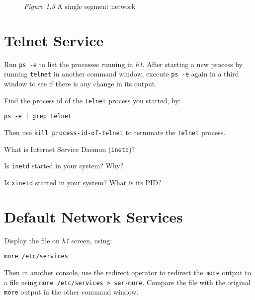 \documentclass{../UTNetLab}
\begin{document}
\begin{center}
\begin{minipage}{0.48\textwidth}
\begin{flushright}
\begin{figure}[H]
                    \caption{\textit{Figure 1.3} A single segment network}        
                \end{figure}
            \end{flushright}
        \end{minipage}
    \end{center}

\section{Telnet Service}
    Run \lstinline{ps -e} to list the processes running in \textit{h1}.
    After starting a new process by running \lstinline{telnet} in another command window, execute \lstinline{ps -e} again in a third window to see if there is any change in its output.

    Find the process id of the \lstinline{telnet} process you started, by:
    \begin{lstlisting}
ps -e | grep telnet
    \end{lstlisting}
    Then use \lstinline[emph={process-id-of-telnet}]{kill process-id-of-telnet} to terminate the \lstinline{telnet} process.
    
    \begin{report}
    \item What is Internet Service Daemon (\lstinline{inetd})?

    \item Is \lstinline{inetd} started in your system?
    Why?

    \item Is \lstinline{xinetd} started in your system? What is its PID?
    \end{report}

\section{Default Network Services}
    Display the file  on \textit{h1} screen, using:
    \begin{lstlisting}
more /etc/services
    \end{lstlisting}
    Then in another console, use the redirect operator to redirect the \lstinline{more} output to
    a file using \lstinline{more /etc/services > ser-more}. Compare the file  with the original \lstinline{more} output in the other command window.
\end{document}
